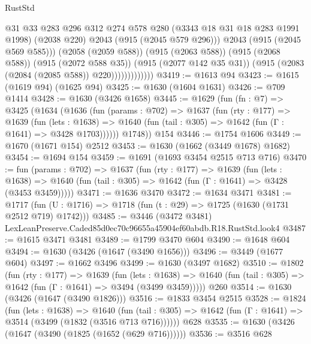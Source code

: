 \begin{lexlean}{RustStd}
\begin{coremodule}
                              @31
                              @33
                              @283
                              @296
                              @312
                              @274
                              @578
                              @280
                              (@3343 @18 @31 @18 @283 @1991 @1998)
                              (@2038 @220)
                              @2043
                              (@915 (@2045 @579 @296)))
                            @2043
                            (@915 (@2045 @569 @585)))
                          (@2058 (@2059 @588))
                          (@915 (@2063 @588))
                          (@915 (@2068 @588))
                          (@915 (@2072 @588 @35))
                          (@915 (@2077 @142 @35 @31))
                          (@915 (@2083 (@2084 (@2085 @588)) @220)))))))))))))
@3419 := @1613 @94
@3423 := @1615 (@1619 @94) (@1625 @94)
@3425 := @1630 (@1604 @1631)
@3426 := @709 @1414
@3428 := @1630 (@3426 @1658)
@3445 := @1629
    (fun (fn : @7) =>
    @3425
      (@1634
        (@1636
          (fun (params : @702) =>
          @1637
            (fun (rty : @177) =>
            @1639
              (fun (lets : @1638) =>
              @1640 (fun (tail : @305) => @1642 (fun (Γ : @1641) => @3428 @1703))))))
        @1748))
    @154
@3446 := @1754 @1606
@3449 := @1670 (@1671 @154) @2512
@3453 := @1630 (@1662 (@3449 @1678) @1682)
@3454 := @1694 @154
@3459 := @1691 (@1693 @3454 @2515 @713 @716)
@3470 := fun (params : @702) =>
  @1637
    (fun (rty : @177) =>
    @1639
      (fun (lets : @1638) =>
      @1640 (fun (tail : @305) => @1642 (fun (Γ : @1641) => @3428 (@3453 @3459)))))
@3471 := @1636 @3470
@3472 := @1634 @3471
@3481 := @1717 (fun (U : @1716) => @1718 (fun (t : @29) => @1725 (@1630 (@1731 @2512 @719) @1742)))
@3485 := @3446 (@3472 @3481) LexLeanPreserve.Caded85d0ec70c96655a45904ef60abdb.R18.RustStd.look4
@3487 := @1615 @3471 @3481
@3489 := @1799 @3470 @604
@3490 := @1648 @604
@3494 := @1630 (@3426 (@1647 (@3490 @1656)))
@3496 := @3449 (@1677 @604)
@3497 := @1662 @3496
@3499 := @1630 (@3497 @1682)
@3510 := @1802
    (fun (rty : @177) =>
    @1639
      (fun (lets : @1638) =>
      @1640 (fun (tail : @305) => @1642 (fun (Γ : @1641) => @3494 (@3499 @3459)))))
    @260
@3514 := @1630 (@3426 (@1647 (@3490 @1826)))
@3516 := @1833 @3454 @2515
@3528 := @1824
    (fun (lets : @1638) =>
    @1640 (fun (tail : @305) => @1642 (fun (Γ : @1641) => @3514 (@3499 (@1832 (@3516 @713 @716))))))
    @628
@3535 := @1630 (@3426 (@1647 (@3490 (@1825 (@1652 (@629 @716))))))
@3536 := @3516 @628

\end{coremodule}
\end{lexlean}
